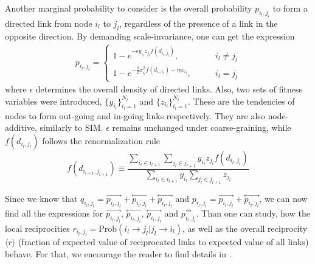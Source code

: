 Another marginal probability to consider is the overall probability $p_{i_l,j_l}$ to form a directed link from node $i_l$ to $j_l$, regardless of the presence of a link in the opposite direction. By demanding scale-invariance, one can get the expression
\begin{align}
    p_{i_l,j_l} = \begin{cases}
        1 - e^{-\epsilon y_{i_l}z_{j_l}f(d_{i_l,j_l})}, \qquad &i_l \neq j_l\\
        1 - e^{-\frac{\delta}{2}x_{i_l}^2f(d_{i_l,i_l}) - \eta w_{i_l}}, \qquad &i_l = j_l
    \end{cases}
\end{align}
where $\epsilon$ determines the overall density of directed links. Also, two sets of fitness variables were introduced, $\{y_{i_l}\}_{i_l=1}^{N_l}$ and $\{z_{i_l}\}_{i_l=1}^{N_l}$. These are the tendencies of nodes to form out-going and in-going links respectively. They are also node-additive, similarly to SIM. $\epsilon$ remains unchanged under coarse-graining, while $f(d_{i_l,j_l})$ follows the renormalization rule
\begin{equation}
    f(d_{i_{l+1},j_{l+1}}) \equiv \frac{\sum_{i_l\in i_{l+1}}\sum_{j_l\in j_{l+1}}y_{i_l}z_{j_l}f(d_{i_l,j_l})}{\sum_{i_l\in i_{l+1}}y_{i_l}\sum_{j_l\in j_{l+1}}z_{j_l}}
\end{equation}

Since we know that $q_{i_l,j_l} = \overset\rightarrow{p_{i_l,j_l}} + \overset\leftarrow{p_{i_l,j_l}} + \overset\leftrightarrow{p_{i_l,j_l}}$ and $p_{i_l,j_l} = \overset\rightarrow{p_{i_l,j_l}} + \overset\leftrightarrow{p_{i_l,j_l}}$, we can now find all the expressions for $\overset\rightarrow{p_{i_l,j_l}}$, $\overset\leftarrow{p_{i_l,j_l}}$, $\overset\leftrightarrow{p_{i_l,j_l}}$ and $\overset{\not\leftrightarrow}{p_{i_l,j_l}}$. Than one can study, how the local reciprocities $r_{i_l,j_l} = \text{Prob}(i_l \rightarrow j_l|j_l \rightarrow i_l)$, as well as the overall reciprocity $\langle r\rangle$ (fraction of expected value of reciprocated links to expected value of all links) behave. For that, we encourage the reader to find details in \cite{Lalli2024}. 

